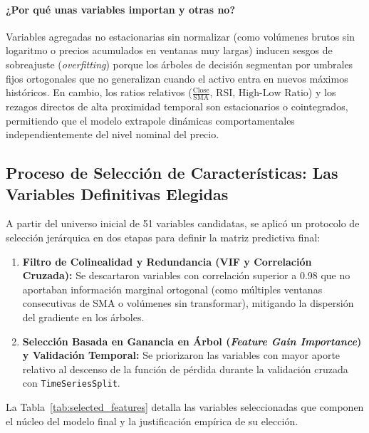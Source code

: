 \documentclass[12pt,letterpaper]{article}
\begin{document}
\paragraph{¿Por qué unas variables importan y otras no?} 
Variables agregadas no estacionarias sin normalizar (como volúmenes brutos sin logaritmo o precios acumulados en ventanas muy largas) inducen sesgos de sobreajuste (\textit{overfitting}) porque los árboles de decisión segmentan por umbrales fijos ortogonales que no generalizan cuando el activo entra en nuevos máximos históricos. En cambio, los ratios relativos ($\frac{\text{Close}}{\text{SMA}}$, $\text{RSI}$, $\text{High-Low Ratio}$) y los rezagos directos de alta proximidad temporal son estacionarios o cointegrados, permitiendo que el modelo extrapole dinámicas comportamentales independientemente del nivel nominal del precio.

\subsection{Proceso de Selección de Características: Las Variables Definitivas Elegidas}
A partir del universo inicial de 51 variables candidatas, se aplicó un protocolo de selección jerárquica en dos etapas para definir la matriz predictiva final:
\begin{enumerate}
    \item \textbf{Filtro de Colinealidad y Redundancia (VIF y Correlación Cruzada):} Se descartaron variables con correlación superior a 0.98 que no aportaban información marginal ortogonal (como múltiples ventanas consecutivas de SMA o volúmenes sin transformar), mitigando la dispersión del gradiente en los árboles.
    \item \textbf{Selección Basada en Ganancia en Árbol (\textit{Feature Gain Importance}) y Validación Temporal:} Se priorizaron las variables con mayor aporte relativo al descenso de la función de pérdida durante la validación cruzada con \texttt{TimeSeriesSplit}.
\end{enumerate}

La Tabla~\ref{tab:selected_features} detalla las variables seleccionadas que componen el núcleo del modelo final y la justificación empírica de su elección.
\end{document}

